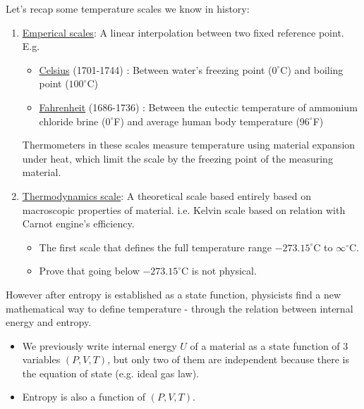 \documentclass[class=article, crop=false, 12pt]{standalone}
\begin{document}
Let's recap some temperature scales we know in history:
\begin{enumerate}
    \item \ul{Emperical scales}: A linear interpolation between two fixed reference point. E.g.
    \begin{itemize}
        \item \href{https://en.wikipedia.org/wiki/Anders_Celsius}{Celsius} (1701-1744) : 
        Between water's freezing point ($0^\circ$C) and boiling point ($100^\circ$C)

        \item \href{https://en.wikipedia.org/wiki/Daniel_Gabriel_Fahrenheit}{Fahrenheit} (1686-1736) :
        Between the eutectic temperature of ammonium chloride brine ($0^\circ$F) and average human body temperature ($96^\circ$F)
        
    \end{itemize}

    Thermometers in these scales measure temperature using material expansion under heat,
    which limit the scale by the freezing point of the measuring material.

    \item \ul{Thermodynamics scale}: A theoretical scale based entirely based on macroscopic properties of material.
    i.e. Kelvin scale based on relation with Carnot engine's efficiency.

    \begin{itemize}
        \item The first scale that defines the full temperature range $-273.15^\circ$C to $\infty^\circ$C.
        \item Prove that going below $-273.15^\circ$C is not physical.
    \end{itemize}
    
\end{enumerate}

However after entropy is established as a state function,
physicists find a new mathematical way to define temperature - 
through the relation between internal energy and entropy.\\
\begin{itemize}
    \item We previously write internal energy $U$ of a material as a state function of 3 variables $(P,V,T)$,
    but only two of them are independent because there is the equation of state (e.g. ideal gas law).

    \item Entropy is also a function of $(P,V,T)$.
\end{itemize}
\end{document}
